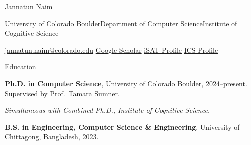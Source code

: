 \documentclass[11pt,letterpaper]{article}
\newcommand{\cvname}{Jannatun Naim}
\newcommand{\cvsection}[1]{%
  \vspace{1.15em}%
  {\Large #1}\par
  \vspace{0.55em}%
}
\newcommand{\cvline}[1]{%
  \hspace*{1.55em}\parbox[t]{0.955\linewidth}{#1}\par
  \vspace{0.34em}%
}
\begin{document}
\thispagestyle{firstpage}

{\centering\Huge \cvname\par}
\vspace{0.45em}
{\centering\small University of Colorado Boulder\enspace\textbullet\enspace Department of Computer Science\enspace\textbullet\enspace Institute of Cognitive Science\par}
\vspace{0.5em}
{\centering\footnotesize
\href{mailto:jannatun.naim@colorado.edu}{jannatun.naim@colorado.edu}\quad\textbullet\quad
\href{https://scholar.google.com/citations?user=SVmryi8AAAAJ&hl=en}{Google Scholar}\quad\textbullet\quad
\href{https://www.colorado.edu/research/ai-institute/jannatun-naim}{iSAT Profile}\quad\textbullet\quad
\href{https://colorado.edu/ics/jannatun-naim}{ICS Profile}\par}








\cvsection{Education}

\cvline{\textbf{Ph.D. in Computer Science}, University of Colorado Boulder, 2024--present. Supervised by Prof.\ Tamara Sumner.}

\cvline{\emph{Simultaneous with Combined Ph.D., Institute of Cognitive Science.}}


\cvline{\textbf{B.S. in Engineering, Computer Science \& Engineering}, University of Chittagong, Bangladesh, 2023.}
\end{document}
